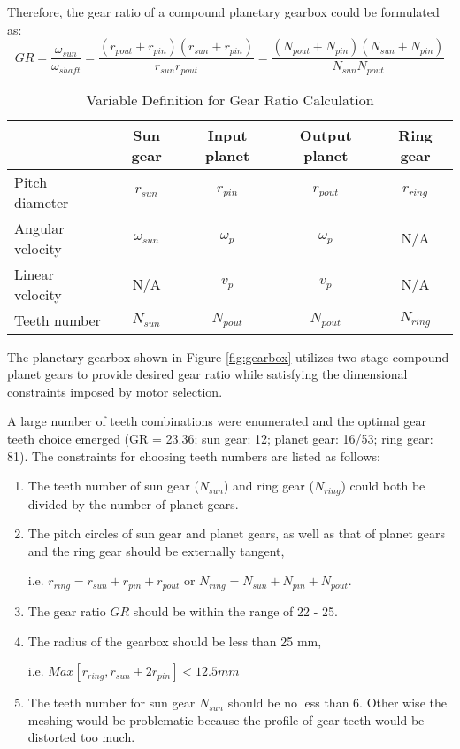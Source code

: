 Therefore, the gear ratio of a compound planetary gearbox could be formulated as:
\begin{equation}
GR = \frac{\omega_{sun}}{\omega_{shaft}} = \frac{(r_{pout}+r_{pin})(r_{sun}+r_{pin})}{r_{sun}r_{pout}} = \frac{(N_{pout}+N_{pin})(N_{sun}+N_{pin})}{N_{sun}N_{pout}}
\end{equation}

\begin{table}[bp]
	\centering
	\caption{Variable Definition for Gear Ratio Calculation}
	\begin{tabular}{lcccc}\hline\hline
		& Sun gear		& Input planet	& Output planet	& Ring gear \\ \hline
		Pitch diameter	& $r_{sun}$	   	& $r_{pin}$		& $r_{pout}$	& $r_{ring}$\\
		Angular velocity& $\omega_{sun}$& $\omega_{p}$	& $\omega_{p}$	& N/A		\\
		Linear velocity	& N/A			& $v_p$			& $v_p$			& N/A		\\
		Teeth number	& $N_{sun}$		& $N_{pout}$	& $N_{pout}$	& $N_{ring}$\\ \hline
	\end{tabular}
	\label{tab:varDefGearbox}
\end{table}

The planetary gearbox shown in Figure \ref{fig:gearbox} utilizes two-stage compound planet gears to provide desired gear ratio while satisfying the dimensional constraints imposed by motor selection. 

A large number of teeth combinations were enumerated and the optimal gear teeth choice emerged (GR = 23.36; sun gear: 12; planet gear: 16/53; ring gear: 81). The constraints for choosing teeth numbers are listed as follows:

\begin{enumerate}
	\item The teeth number of sun gear ($N_{sun}$) and ring gear ($N_{ring}$) could both be divided by the number of planet gears.
	\item The pitch circles of sun gear and planet gears, as well as that of planet gears and the ring gear should be externally tangent, 
	
	i.e. $r_{ring}=r_{sun}+r_{pin}+r_{pout}$ or $N_{ring}=N_{sun}+N_{pin}+N_{pout}$.
	\item The gear ratio $GR$ should be within the range of 22 - 25.
	\item The radius of the gearbox should be less than 25 mm, 
	
	i.e. $Max[r_{ring},r_{sun}+2r_{pin}]<12.5 mm$
	\item The teeth number for sun gear $N_{sun}$ should be no less than 6. Other wise the meshing would be problematic because the profile of gear teeth would be distorted too much.
\end{enumerate}

